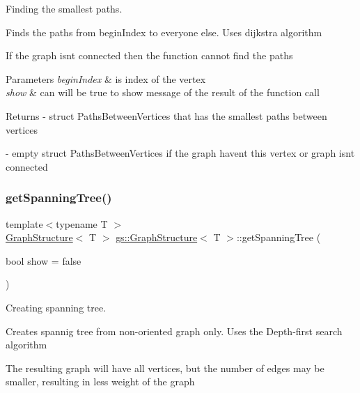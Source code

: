 Finding the smallest paths. 

Finds the paths from begin\+Index to everyone else. Uses dijkstra algorithm

If the graph isn\textquotesingle{}t connected then the function cannot find the paths


\begin{DoxyParams}{Parameters}
{\em begin\+Index} & is index of the vertex \\
\hline
{\em show} & can will be true to show message of the result of the function call \\
\hline
\end{DoxyParams}
\begin{DoxyReturn}{Returns}
-\/ \textquotesingle{}struct Paths\+Between\+Vertices\textquotesingle{} that has the smallest paths between vertices 

-\/ empty \textquotesingle{}struct Paths\+Between\+Vertices\textquotesingle{} if the graph haven\textquotesingle{}t this vertex or graph isn\textquotesingle{}t connected 
\end{DoxyReturn}
\mbox{\label{classgs_1_1_graph_structure_adb32325d5e18eaf7bec12e6fc64e93c9}} 
\subsubsection{\texorpdfstring{get\+Spanning\+Tree()}{getSpanningTree()}}
{\footnotesize\ttfamily template$<$typename T $>$ \\
\mbox{\hyperlink{classgs_1_1_graph_structure}{Graph\+Structure}}$<$ T $>$ \mbox{\hyperlink{classgs_1_1_graph_structure}{gs\+::\+Graph\+Structure}}$<$ T $>$\+::get\+Spanning\+Tree (\begin{DoxyParamCaption}\item[{bool}]{show = {\ttfamily false} }\end{DoxyParamCaption})}



Creating spanning tree. 

Creates spannig tree from non-\/oriented graph only. Uses the Depth-\/first search algorithm

The resulting graph will have all vertices, but the number of edges may be smaller, resulting in less weight of the graph

